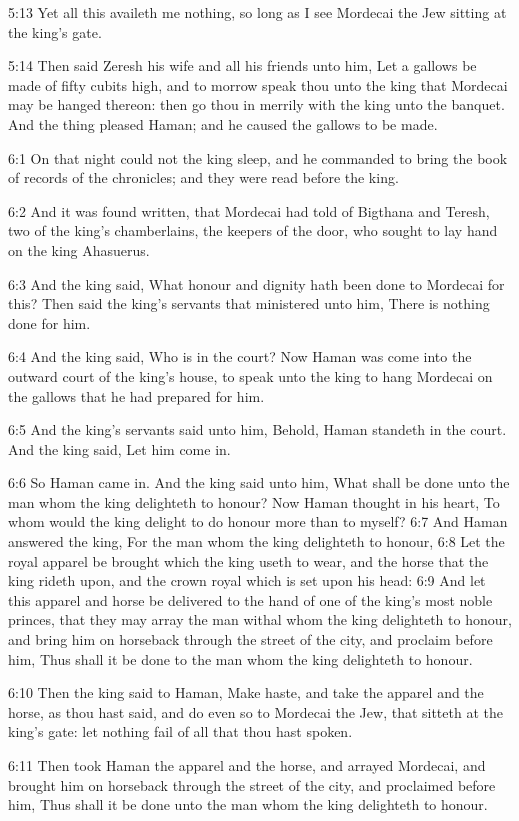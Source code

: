 5:13 Yet all this availeth me nothing, so long as I see Mordecai the
Jew sitting at the king's gate.

5:14 Then said Zeresh his wife and all his friends unto him, Let a
gallows be made of fifty cubits high, and to morrow speak thou unto
the king that Mordecai may be hanged thereon: then go thou in merrily
with the king unto the banquet. And the thing pleased Haman; and he
caused the gallows to be made.

6:1 On that night could not the king sleep, and he commanded to bring
the book of records of the chronicles; and they were read before the
king.

6:2 And it was found written, that Mordecai had told of Bigthana and
Teresh, two of the king's chamberlains, the keepers of the door, who
sought to lay hand on the king Ahasuerus.

6:3 And the king said, What honour and dignity hath been done to
Mordecai for this? Then said the king's servants that ministered unto
him, There is nothing done for him.

6:4 And the king said, Who is in the court? Now Haman was come into
the outward court of the king's house, to speak unto the king to hang
Mordecai on the gallows that he had prepared for him.

6:5 And the king's servants said unto him, Behold, Haman standeth in
the court. And the king said, Let him come in.

6:6 So Haman came in. And the king said unto him, What shall be done
unto the man whom the king delighteth to honour? Now Haman thought in
his heart, To whom would the king delight to do honour more than to
myself?  6:7 And Haman answered the king, For the man whom the king
delighteth to honour, 6:8 Let the royal apparel be brought which the
king useth to wear, and the horse that the king rideth upon, and the
crown royal which is set upon his head: 6:9 And let this apparel and
horse be delivered to the hand of one of the king's most noble
princes, that they may array the man withal whom the king delighteth
to honour, and bring him on horseback through the street of the city,
and proclaim before him, Thus shall it be done to the man whom the
king delighteth to honour.

6:10 Then the king said to Haman, Make haste, and take the apparel and
the horse, as thou hast said, and do even so to Mordecai the Jew, that
sitteth at the king's gate: let nothing fail of all that thou hast
spoken.

6:11 Then took Haman the apparel and the horse, and arrayed Mordecai,
and brought him on horseback through the street of the city, and
proclaimed before him, Thus shall it be done unto the man whom the
king delighteth to honour.

